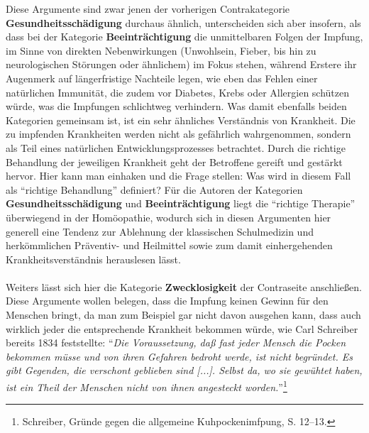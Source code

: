 \documentclass[
    a4paper,
    12pt,
    hyphens,
    chapterprefix=true,
    headheight=33pt,
    footheight=29pt,
    headings=optiontohead,
]{scrartcl}
\begin{document}
{Diese Argumente sind zwar jenen der vorherigen Contrakategorie \textbf{Gesundheitsschädigung} durchaus ähnlich, unterscheiden sich aber insofern, als dass bei der Kategorie \textbf{Beeinträchtigung} die unmittelbaren Folgen der Impfung, im Sinne von direkten Nebenwirkungen (Unwohlsein, Fieber, bis hin zu neurologischen Störungen oder ähnlichem) im Fokus stehen, während Erstere ihr Augenmerk auf längerfristige Nachteile legen, wie eben das Fehlen einer natürlichen Immunität, die zudem vor Diabetes, Krebs oder Allergien schützen würde, was die Impfungen schlichtweg verhindern. Was damit ebenfalls beiden Kategorien gemeinsam ist, ist ein sehr ähnliches Verständnis von Krankheit. Die zu impfenden Krankheiten werden nicht als gefährlich wahrgenommen, sondern als Teil eines natürlichen Entwicklungsprozesses betrachtet. Durch die richtige Behandlung der jeweiligen Krankheit geht der Betroffene gereift und gestärkt hervor. Hier kann man einhaken und die Frage stellen: Was wird in diesem Fall als "`richtige Behandlung"' definiert? Für die Autoren der Kategorien \textbf{Gesundheitsschädigung} und \textbf{Beeinträchtigung} liegt die "`richtige Therapie"' überwiegend in der Homöopathie, wodurch sich in diesen Argumenten hier generell eine Tendenz zur Ablehnung der klassischen Schulmedizin und herkömmlichen Präventiv- und Heilmittel sowie zum damit einhergehenden Krankheitsverständnis herauslesen lässt.\\
\\
Weiters lässt sich hier die Kategorie \textbf{Zwecklosigkeit} der Contraseite anschließen. Diese Argumente wollen belegen, dass die Impfung keinen Gewinn für den Menschen bringt, da man zum Beispiel gar nicht davon ausgehen kann, dass auch wirklich jeder die entsprechende Krankheit bekommen würde, wie Carl Schreiber bereits 1834 feststellte: "`\textit{Die Voraussetzung, daß fast jeder Mensch die Pocken bekommen müsse und von ihren Gefahren bedroht werde, ist nicht begründet. Es gibt Gegenden, die verschont geblieben sind [...]. Selbst da, wo sie gewühtet haben, ist ein Theil der Menschen nicht von ihnen angesteckt worden.}"'\footnote{Schreiber, Gründe gegen die allgemeine Kuhpockenimfpung,  S. 12--13.}\\
}
\end{document}
